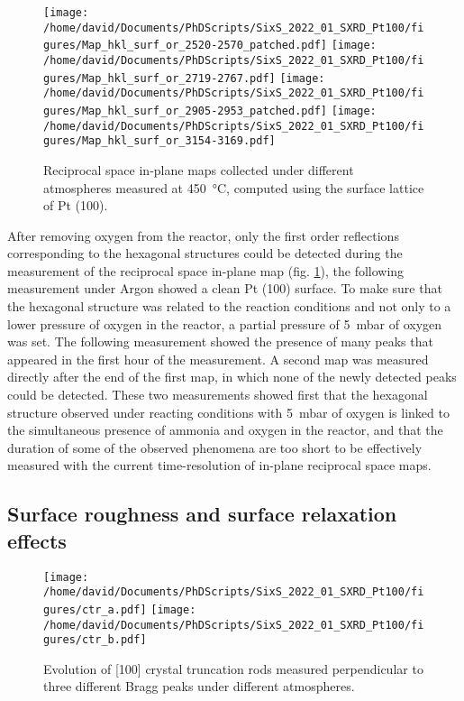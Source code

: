 \begin{figure}[!htb]
    \centering
    \texttt{[image: /home/david/Documents/PhDScripts/SixS\_2022\_01\_SXRD\_Pt100/figures/Map\_hkl\_surf\_or\_2520-2570\_patched.pdf]}
    \texttt{[image: /home/david/Documents/PhDScripts/SixS\_2022\_01\_SXRD\_Pt100/figures/Map\_hkl\_surf\_or\_2719-2767.pdf]}
    \texttt{[image: /home/david/Documents/PhDScripts/SixS\_2022\_01\_SXRD\_Pt100/figures/Map\_hkl\_surf\_or\_2905-2953\_patched.pdf]}
    \texttt{[image: /home/david/Documents/PhDScripts/SixS\_2022\_01\_SXRD\_Pt100/figures/Map\_hkl\_surf\_or\_3154-3169.pdf]}
    \caption{
        Reciprocal space in-plane maps collected under different atmospheres measured at \qty{450}{\degreeCelsius}, computed using the surface lattice of Pt (100).
    }
    \label{fig:MapsPt100C}
\end{figure}

After removing oxygen from the reactor, only the first order reflections corresponding to the hexagonal structures could be detected during the measurement of the reciprocal space in-plane map (fig. \ref{fig:MapsPt100C}), the following measurement under Argon showed a clean Pt (100) surface.
To make sure that the hexagonal structure was related to the reaction conditions and not only to a lower pressure of oxygen in the reactor, a partial pressure of \qty{5}{\milli\bar} of oxygen was set.
The following measurement showed the presence of many peaks that appeared in the first hour of the measurement.
A second map was measured directly after the end of the first map, in which none of the newly detected peaks could be detected.
These two measurements showed first that the hexagonal structure observed under reacting conditions with \qty{5}{\milli\bar} of oxygen is linked to the simultaneous presence of ammonia and oxygen in the reactor, and that the duration of some of the observed phenomena are too short to be effectively measured with the current time-resolution of in-plane reciprocal space maps.

\subsection{Surface roughness and surface relaxation effects}

\begin{figure}[!htb]
    \centering
    \texttt{[image: /home/david/Documents/PhDScripts/SixS\_2022\_01\_SXRD\_Pt100/figures/ctr\_a.pdf]}
    \texttt{[image: /home/david/Documents/PhDScripts/SixS\_2022\_01\_SXRD\_Pt100/figures/ctr\_b.pdf]}
    \caption{
        Evolution of [100] crystal truncation rods measured perpendicular to three different Bragg peaks under different atmospheres.
    }
    \label{fig:CTRPt100}
\end{figure}

